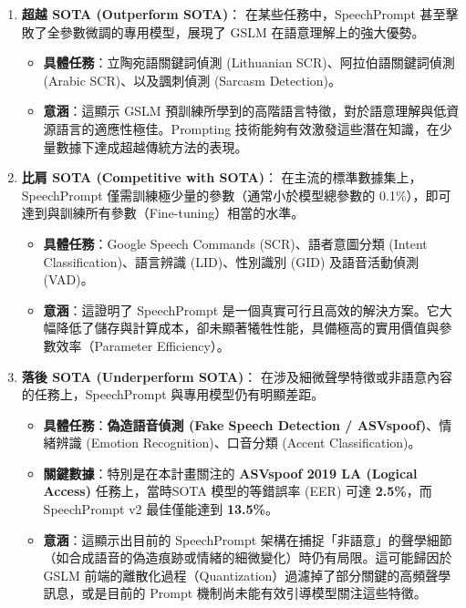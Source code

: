 \begin{enumerate}
    \item \textbf{超越 SOTA (Outperform SOTA)}：
    在某些任務中，SpeechPrompt 甚至擊敗了全參數微調的專用模型，展現了 GSLM 在語意理解上的強大優勢。
    \begin{itemize}
        \item \textbf{具體任務}：立陶宛語關鍵詞偵測 (Lithuanian SCR)、阿拉伯語關鍵詞偵測 (Arabic SCR)、以及諷刺偵測 (Sarcasm Detection)。
        \item \textbf{意涵}：這顯示 GSLM 預訓練所學到的高階語言特徵，對於語意理解與低資源語言的適應性極佳。Prompting 技術能夠有效激發這些潛在知識，在少量數據下達成超越傳統方法的表現。
    \end{itemize}

    \item \textbf{比肩 SOTA (Competitive with SOTA)}：
    在主流的標準數據集上，SpeechPrompt 僅需訓練極少量的參數（通常小於模型總參數的 0.1\%），即可達到與訓練所有參數（Fine-tuning）相當的水準。
    \begin{itemize}
        \item \textbf{具體任務}：Google Speech Commands (SCR)、語者意圖分類 (Intent Classification)、語言辨識 (LID)、性別識別 (GID) 及語音活動偵測 (VAD)。
        \item \textbf{意涵}：這證明了 SpeechPrompt 是一個真實可行且高效的解決方案。它大幅降低了儲存與計算成本，卻未顯著犧牲性能，具備極高的實用價值與參數效率（Parameter Efficiency）。
    \end{itemize}

    \item \textbf{落後 SOTA (Underperform SOTA)}：
    在涉及細微聲學特徵或非語意內容的任務上，SpeechPrompt 與專用模型仍有明顯差距。
    \begin{itemize}
        \item \textbf{具體任務}：\textbf{偽造語音偵測 (Fake Speech Detection / ASVspoof)}、情緒辨識 (Emotion Recognition)、口音分類 (Accent Classification)。
        \item \textbf{關鍵數據}：特別是在本計畫關注的 \textbf{ASVspoof 2019 LA (Logical Access)} 任務上，當時SOTA 模型的等錯誤率 (EER) 可達 \textbf{2.5\%}，而 SpeechPrompt v2 最佳僅能達到 \textbf{13.5\%}。
        \item \textbf{意涵}：這顯示出目前的 SpeechPrompt 架構在捕捉「非語意」的聲學細節（如合成語音的偽造痕跡或情緒的細微變化）時仍有局限。這可能歸因於 GSLM 前端的離散化過程（Quantization）過濾掉了部分關鍵的高頻聲學訊息，或是目前的 Prompt 機制尚未能有效引導模型關注這些特徵。
    \end{itemize}
\end{enumerate}


